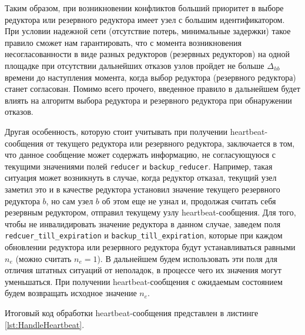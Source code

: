 \documentclass{article}
\theoremstyle{plain}
\theoremstyle{plain}
\theoremstyle{plain}
\theoremstyle{plain}
\theoremstyle{definition}
\theoremstyle{remark}
\theoremstyle{plain}
\begin{document}
Таким образом, при возникновении конфликтов больший приоритет в выборе редуктора или резервного редуктора имеет узел с большим идентификатором. При условии надежной сети (отсутствие потерь, минимальные задержки) такое правило сможет нам гарантировать, что с момента возникновения несогласованности в виде разных редукторов (резервных редукторов) на одной площадке при отсутствии дальнейших отказов узлов пройдет не больше $\Delta_{hb}$ времени до наступления момента, когда выбор редуктора (резервного редуктора) станет согласован. Помимо всего прочего, введенное правило в дальнейшем будет влиять на алгоритм выбора редуктора и резервного редуктора при обнаружении отказов.

Другая особенность, которую стоит учитывать при получении heartbeat-сообщения от текущего редуктора или резервного редуктора, заключается в том, что данное сообщение может содержать информацию, не согласующуюся с текущими значениями полей \texttt{reducer} и \texttt{backup\_reducer}. Например, такая ситуация может возникнуть в случае, когда редуктор отказал, текущий узел заметил это и в качестве редуктора установил значение текущего резервного редуктора $b$, но сам узел $b$ об этом еще не узнал и, продолжая считать себя резервным редуктором, отправил текущему узлу heartbeat-сообщения. Для того, чтобы не инвалидировать значение редуктора в данном случае, заведем поля \texttt{redcuer\_till\_expiration} и \texttt{backup\_till\_expiration}, которые при каждом обновлении редуктора или резервного редуктора будут устанавливаться равными $n_e$ (можно считать $n_e = 1$). В дальнейшем будем использовать эти поля для отличия штатных ситуаций от неполадок, в процессе чего их значения могут уменьшаться. При получении heartbeat-сообщения с ожидаемым состоянием будем возвращать исходное значение $n_e$.

Итоговый код обработки heartbeat-сообщения представлен в листинге \ref{lst:HandleHeartbeat}.
\end{document}
